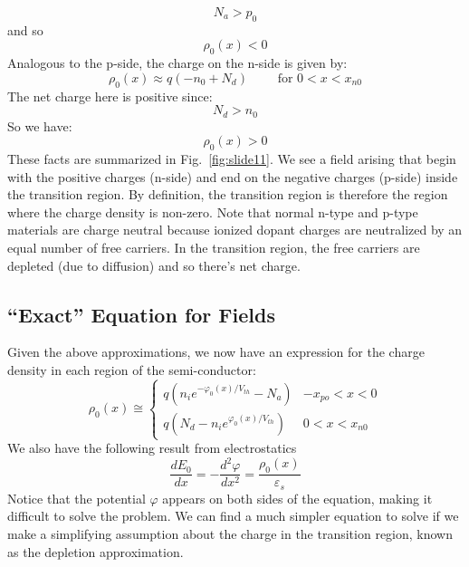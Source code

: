     \begin{equation} 
        {N_a} > {p_0} 
    \end{equation}
and so
    \begin{equation}
        {\rho _0}(x) < 0 
    \end{equation}
Analogous to the p-side, the charge on the n-side is given by:
    \begin{equation} 
        {\rho _0}(x) \approx q( - {n_0} + {N_d}) \,\,\quad\quad\text{for}\,\, 0 < x < {x_{n0}}
    \end{equation}
The net charge here is positive since:
    \begin{equation} 
        {N_d} > {n_0} 
    \end{equation}
So we have:
    \begin{equation} 
        {\rho _0}(x) > 0 
    \end{equation}
These facts are summarized in Fig.~\ref{fig:slide11}.  We see a field arising that begin with the positive charges (n-side) and end on the negative charges (p-side) inside the transition region.  By definition, the transition region is therefore the region where the charge density is non-zero.  Note that normal n-type and p-type materials are charge neutral because ionized dopant charges are neutralized by an equal number of free carriers.  In the transition region, the free carriers are depleted (due to diffusion) and so there's net charge.   
\subsection{“Exact” Equation for Fields}
Given the above approximations, we now have an expression for the charge density in each region of the semi-conductor:
    \begin{equation}
        \rho _0(x) \cong \left\{ 
        \begin{array}{*{20}{c}}
        q({n_i}{e^{ - {\varphi _0}(x)/{V_{th}}}} - {N_a}) &  - {x_{po}} < x < 0\\
        q({N_d} - {n_i}{e^{{\varphi _0}(x)/{V_{th}}}}) & 0 < x < {x_{n0}}
        \end{array} 
        \right.
    \end{equation}
We also have the following result from electrostatics
    \begin{equation} 
        \frac{{d{E_0}}}{{dx}} =  - \frac{{{d^2}\varphi }}{{d{x^2}}} = \frac{{{\rho _0}(x)}}{{{\varepsilon _s}}} 
    \end{equation}
Notice that the potential $\varphi$ appears on both sides of the equation, making it difficult to solve the problem.   We can find a much simpler equation to solve if we make a simplifying assumption about the charge in the transition region, known as the depletion approximation.
